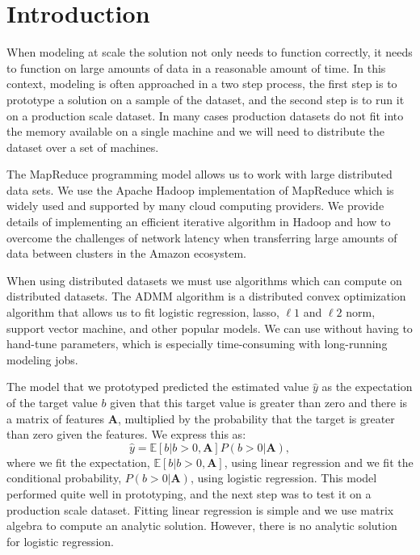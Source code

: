 \documentclass[10pt, conference, compsocconf]{IEEEtran}
\begin{document}
\section{Introduction}
When modeling at scale the solution not only needs to function correctly, it needs to function on large amounts of data in a reasonable amount of time.  In this context, modeling is often approached in a two step process, the first step is to prototype a solution on a sample of the dataset, and the second step is to run it on a production scale dataset.  In many cases production datasets do not fit into the memory available on a single machine and we will need to distribute the dataset over a set of machines.

The MapReduce programming model \cite{dean2004} allows us to work with large distributed data sets.  We use the Apache Hadoop \cite{white2009} implementation of MapReduce which is widely used and supported by many cloud computing providers.  We provide details of implementing an efficient iterative algorithm in Hadoop and how to overcome the challenges of network latency when transferring large amounts of data between clusters in the Amazon ecosystem. 

When using distributed datasets we must use algorithms which can compute on distributed datasets.  The ADMM algorithm is a distributed convex optimization algorithm that allows us to fit logistic regression, lasso, $\ell1$ and $\ell2$ norm, support vector machine, and other popular models.  We can use without having to hand-tune parameters, which is especially time-consuming with long-running modeling jobs.

The model that we prototyped predicted the estimated value $\hat{y}$ as the expectation of the target value $b$ given that this target value is greater than zero and there is a matrix of features $\mathbf{A}$, multiplied by the probability that the target is greater than zero given the features.  We express this as:
\begin{equation}
\hat{y} = \mathbb{E}[b|b>0,\mathbf{A}]P(b>0|\mathbf{A}),
\end{equation}
where we fit the expectation, $\mathbb{E}[b|b>0,\mathbf{A}]$, using linear regression and we fit the conditional probability, $P(b>0|\mathbf{A})$, using logistic regression.  This model performed quite well in prototyping, and the next step was to test it on a production scale dataset.  Fitting linear regression is simple and we use matrix algebra to compute an analytic solution.  However, there is no analytic solution for logistic regression.
\end{document}
